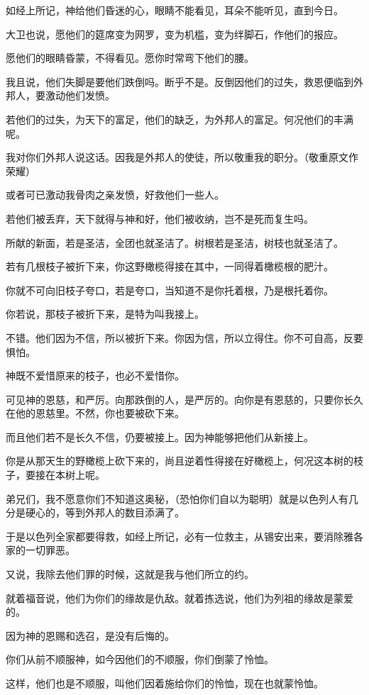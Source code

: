 \documentclass[12pt,oneside]{book}
\begin{document}
如经上所记，神给他们昏迷的心，眼睛不能看见，耳朵不能听见，直到今日。

大卫也说，愿他们的筵席变为网罗，变为机槛，变为绊脚石，作他们的报应。

愿他们的眼睛昏蒙，不得看见。愿你时常弯下他们的腰。

我且说，他们失脚是要他们跌倒吗。断乎不是。反倒因他们的过失，救恩便临到外邦人，要激动他们发愤。

若他们的过失，为天下的富足，他们的缺乏，为外邦人的富足。何况他们的丰满呢。

我对你们外邦人说这话。因我是外邦人的使徒，所以敬重我的职分。（敬重原文作荣耀）

或者可已激动我骨肉之亲发愤，好救他们一些人。

若他们被丢弃，天下就得与神和好，他们被收纳，岂不是死而复生吗。

所献的新面，若是圣洁，全团也就圣洁了。树根若是圣洁，树枝也就圣洁了。

若有几根枝子被折下来，你这野橄榄得接在其中，一同得着橄榄根的肥汁。

你就不可向旧枝子夸口，若是夸口，当知道不是你托着根，乃是根托着你。

你若说，那枝子被折下来，是特为叫我接上。

不错。他们因为不信，所以被折下来。你因为信，所以立得住。你不可自高，反要惧怕。

神既不爱惜原来的枝子，也必不爱惜你。

可见神的恩慈，和严厉。向那跌倒的人，是严厉的。向你是有恩慈的，只要你长久在他的恩慈里。不然，你也要被砍下来。

而且他们若不是长久不信，仍要被接上。因为神能够把他们从新接上。

你是从那天生的野橄榄上砍下来的，尚且逆着性得接在好橄榄上，何况这本树的枝子，要接在本树上呢。

弟兄们，我不愿意你们不知道这奥秘，（恐怕你们自以为聪明）就是以色列人有几分是硬心的，等到外邦人的数目添满了。

于是以色列全家都要得救，如经上所记，必有一位救主，从锡安出来，要消除雅各家的一切罪恶。

又说，我除去他们罪的时候，这就是我与他们所立的约。

就着福音说，他们为你们的缘故是仇敌。就着拣选说，他们为列祖的缘故是蒙爱的。

因为神的恩赐和选召，是没有后悔的。

你们从前不顺服神，如今因他们的不顺服，你们倒蒙了怜恤。

这样，他们也是不顺服，叫他们因着施给你们的怜恤，现在也就蒙怜恤。
\end{document}
